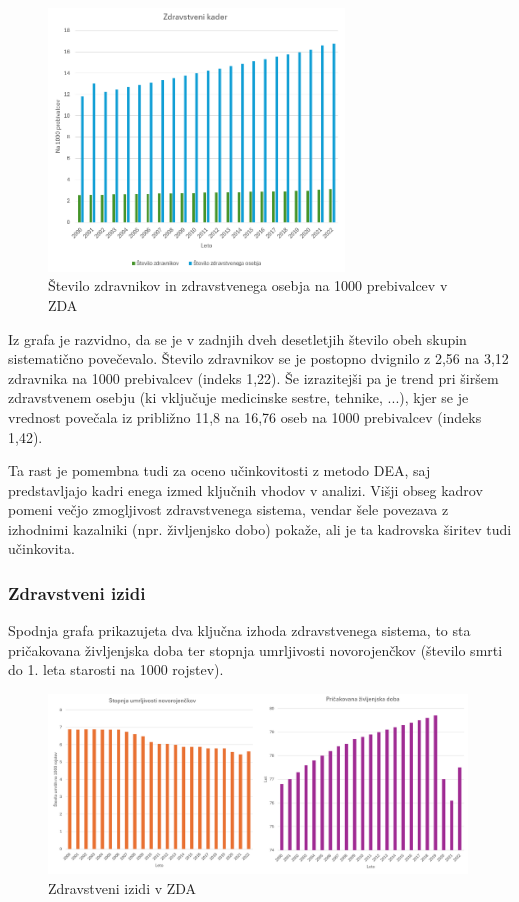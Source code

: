 \documentclass[12pt,a4paper]{article}
\theoremstyle{definition}
\begin{document}
\begin{figure}[H]
    \centering
    \includegraphics[width=0.7\textwidth]{zda_stevilo_zdravnikov.png}
    \caption{Število zdravnikov in zdravstvenega osebja na 1000 prebivalcev v ZDA}
    \label{fig:zda_stevilo_zdravnikov}
\end{figure}

Iz grafa je razvidno, da se je v zadnjih dveh desetletjih število obeh skupin sistematično povečevalo. 
Število zdravnikov se je postopno dvignilo z 2,56 na 3,12 zdravnika na 1000 prebivalcev (indeks 1,22). 
Še izrazitejši pa je trend pri širšem zdravstvenem osebju (ki vključuje medicinske sestre, tehnike, ...), 
kjer se je vrednost povečala iz približno 11,8 na 16,76 oseb na 1000 prebivalcev (indeks 1,42).

Ta rast je pomembna tudi za oceno učinkovitosti z metodo DEA, saj predstavljajo kadri enega izmed ključnih vhodov v analizi. 
Višji obseg kadrov pomeni večjo zmogljivost zdravstvenega sistema, vendar šele povezava z izhodnimi kazalniki 
(npr. življenjsko dobo) pokaže, ali je ta kadrovska širitev tudi učinkovita.

\subsubsection{Zdravstveni izidi}

Spodnja grafa prikazujeta dva ključna izhoda zdravstvenega sistema, to sta
pričakovana življenjska doba ter stopnja umrljivosti novorojenčkov (število smrti do 1. leta starosti na 1000 rojstev).

\begin{figure}[H]
    \centering
    \includegraphics[width=0.99\textwidth]{zda_zdravstveni_izzidi.png}
    \caption{Zdravstveni izidi v ZDA}
    \label{fig:zda_zdravstveni_izzidi}
\end{figure}
\end{document}
